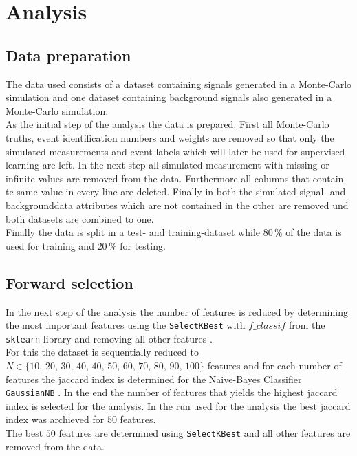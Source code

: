 \section{Analysis}\label{sec:Analysis}

\subsection{Data preparation}

The data used consists of a dataset containing signals generated in a Monte-Carlo simulation and one dataset containing 
background signals also generated in a Monte-Carlo simulation. \\
As the initial step of the analysis the data is prepared.
First all Monte-Carlo truths, event identification numbers and weights are removed so that only the simulated measurements and
event-labels which will later be used for supervised learning are left. In the next step all simulated measurement with missing or
infinite values are removed from the data. Furthermore all columns that contain te same value in every line are deleted.
Finally in both the simulated signal- and backgrounddata attributes which are not contained in the other are removed und
both datasets are combined to one. \\
Finally the data is split in a test- and training-dataset while $80 \, \%$ of the data is used for training and $20 \,\%$
for testing.

\subsection{Forward selection}

In the next step of the analysis the number of features is reduced by determining the most important features using
the \texttt{SelectKBest} with \texttt{$f\_classif$} from the \texttt{sklearn} library and removing all other features \cite{scikit-learn}. \\
For this the dataset is sequentially reduced to \\
$N \in \{ 10, \, 20, \, 30, \, 40, \, 40, \, 50, \, 60, \, 70, \, 80, \, 90, \, 100 \}$
features and for each number of features the jaccard index is determined for the Naive-Bayes Classifier \texttt{GaussianNB} \cite{scikit-learn}.
In the end the number of features that yields the highest jaccard index is selected for the analysis.
In the run used for the analysis the best jaccard index was archieved for $50$ features. \\
The best $50$ features are determined using \texttt{SelectKBest} and all other features are removed from the data.

